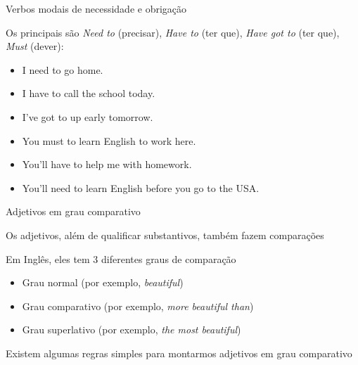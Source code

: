 \documentclass[compress,mathserif]{beamer}
\begin{document}

\begin{frame}{Verbos modais de necessidade e obrigação}

Os principais são \textit{Need to} (precisar), \textit{Have to} (ter que), \textit{Have got to} (ter que), \textit{Must} (dever):

\vspace{0.5cm}

\begin{itemize}
    \item I need to go home.
    \item I have to call the school today.
    \item I’ve got to up early tomorrow.
    \item You must to learn English to work here.
    \item You’ll have to help me with homework.
    \item You’ll need to learn English before you go to the USA.
\end{itemize}

\end{frame}


\begin{frame}{Adjetivos em grau comparativo}

Os adjetivos, além de qualificar substantivos, também fazem comparações

\vspace{0.5cm}

Em Inglês, eles tem 3 diferentes graus de comparação
\begin{itemize}
    \item Grau normal (por exemplo, \textit{beautiful})
    \item Grau comparativo (por exemplo, \textit{more beautiful than})
    \item Grau superlativo (por exemplo, \textit{the most beautiful})
\end{itemize}

\vspace{0.5cm}

Existem algumas regras simples para montarmos adjetivos em grau comparativo

\end{frame}

\end{document}
